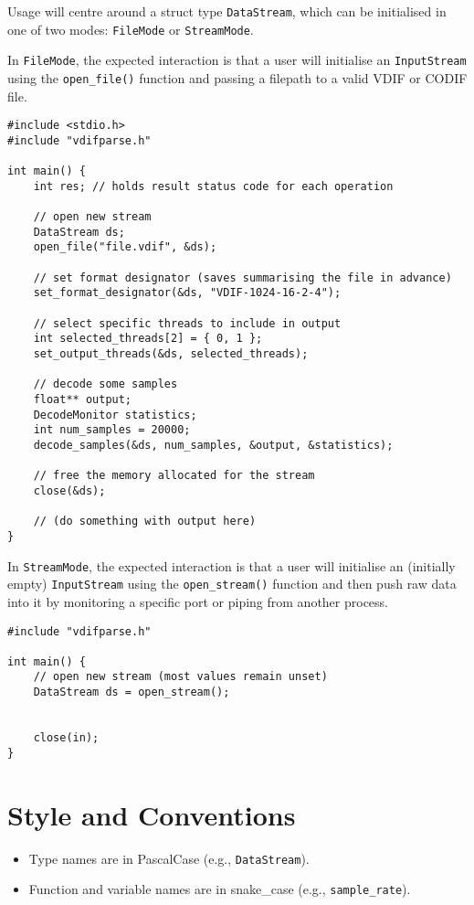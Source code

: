 \documentclass[11pt]{article}
\begin{document}
Usage will centre around a struct type \lstinline{DataStream}, which can be initialised in one of two modes: \lstinline{FileMode} or \lstinline{StreamMode}.

In \lstinline{FileMode}, the expected interaction is that a user will initialise an \lstinline{InputStream} using the \lstinline{open_file()} function and passing a filepath to a valid VDIF or CODIF file.

\begin{lstlisting}
#include <stdio.h>
#include "vdifparse.h"

int main() { 
	int res; // holds result status code for each operation
	
	// open new stream
	DataStream ds;
	open_file("file.vdif", &ds);
	
	// set format designator (saves summarising the file in advance)
	set_format_designator(&ds, "VDIF-1024-16-2-4");
	
	// select specific threads to include in output
	int selected_threads[2] = { 0, 1 };
	set_output_threads(&ds, selected_threads);
	
	// decode some samples
	float** output;
	DecodeMonitor statistics;
	int num_samples = 20000;
	decode_samples(&ds, num_samples, &output, &statistics);
	
	// free the memory allocated for the stream
	close(&ds);
	
	// (do something with output here)
} 
\end{lstlisting} 

In \lstinline{StreamMode}, the expected interaction is that a user will initialise an (initially empty) \lstinline{InputStream} using the \lstinline{open_stream()} function and then push raw data into it by monitoring a specific port or piping from another process.

\begin{lstlisting} 
#include "vdifparse.h"

int main() { 
	// open new stream (most values remain unset)
	DataStream ds = open_stream();
	
	
	close(in);
} 
\end{lstlisting} 

\section{Style and Conventions}

\begin{itemize}
	\item Type names are in PascalCase (e.g., \lstinline{DataStream}).
	\item Function and variable names are in snake\_case (e.g., \lstinline{sample_rate}).
\end{itemize}
\end{document}
